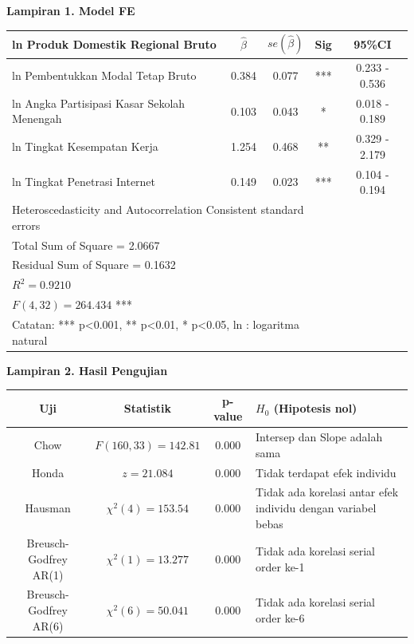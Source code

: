 \newpage
\singlespacing

\textbf{Lampiran 1. Model FE}

\begin{table}[h]
\centering
    \begin{tabular}[t]{p{7cm}cccc}
    \toprule
    ln Produk Domestik Regional Bruto & $\hat{\beta}$ & $se(\hat{\beta})$ & Sig & 95\%CI \\
    \midrule
    ln Pembentukkan Modal Tetap Bruto & 0.384  & 0.077  & ***  & 0.233 - 0.536 \\
    ln Angka Partisipasi Kasar Sekolah Menengah & 0.103  & 0.043  & *    & 0.018 - 0.189 \\
    ln Tingkat Kesempatan Kerja & 1.254  & 0.468  & **   & 0.329 - 2.179 \\
    ln Tingkat Penetrasi Internet & 0.149  & 0.023  & ***  & 0.104 - 0.194 \\
    \midrule
        \multicolumn{4}{l}{Heteroscedasticity and Autocorrelation Consistent standard errors}\\
    \midrule
        \multicolumn{4}{l}{Total Sum of Square = 2.0667} \\
        \multicolumn{4}{l}{Residual Sum of Square = 0.1632} \\
        \multicolumn{4}{l}{$R^{2}= 0.9210$} \\
        \multicolumn{4}{l}{$F(4, 32) = 264.434$ ***} \\
    \midrule
        \multicolumn{4}{l}{Catatan: *** p<0.001, ** p<0.01, * p<0.05, ln : logaritma natural}\\
    \bottomrule
    \end{tabular}
\end{table}


\textbf{Lampiran 2. Hasil Pengujian}

\begin{center}
\begin{tabular}{cccp{5cm}}
\toprule
Uji                 & Statistik             & p-value  & $H_0$ (Hipotesis nol) \\
\midrule
Chow                & $F(160, 33) = 142.81$ & 0.000    & Intersep dan Slope adalah sama \\
Honda               & $z = 21.084$          & 0.000    & Tidak terdapat efek individu    \\
Hausman             & $\chi^2(4) = 153.54$  & 0.000    & Tidak ada korelasi antar efek individu dengan variabel bebas\\
Breusch-Godfrey AR(1) & $\chi^2(1) = 13.277$  & 0.000    & Tidak ada korelasi serial order ke-1    \\
Breusch-Godfrey AR(6) & $\chi^2(6) = 50.041$  & 0.000    & Tidak ada korelasi serial order ke-6    \\
\bottomrule
\end{tabular}
\end{center}

